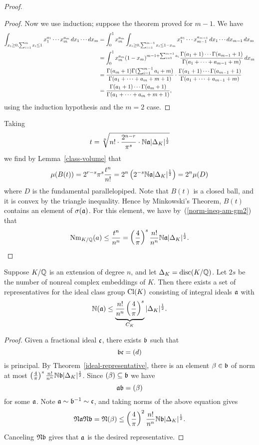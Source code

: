 \begin{proof}
\begin{proof}
Now we use induction; suppose the theorem proved for $m-1$. We have 
\begin{align*}
\int_{x_i\ge 0,\sum_{i=1}^m x_i\le 1} x_1^{a_1}\cdots x_m^{a_m}\,dx_1\cdots dx_m
&=\int_0^1 x_m^{a_m}\int_{x_i\ge 0, \sum_{i=1}^{m-1} x_i\le 1-x_m} x_1^{a_1}\cdots x_{m-1}^{a_{m-1}}\,dx_1\cdots dx_{m-1}\,dx_m\\
&=\int_0^1 x_m^{a_m} (1-x_m)^{m-1+\sum_{i=1}^{m-1} a_i}\frac{\Ga(a_1+1)\cdots \Ga(a_{m-1}+1)}{\Ga(a_1+\cdots +a_{m-1}+m)}\,dx_m\\%
&=%
\frac{\Ga(a_m+1)\Ga(\sum_{i=1}^{m-1}a_i +m)}{\Ga(a_1+\cdots +a_m+m+1)}\cdot \frac{\Ga(a_1+1)\cdots \Ga(a_{m-1}+1)}{\Ga(a_1+\cdots +a_{m-1}+m)}\\%
&=%
\frac{\Ga(a_1+1)\cdots \Ga(a_m+1)}{\Ga(a_1+\cdots +a_m+m+1)},
\end{align*}
using the induction hypothesis and the $m=2$ case.
\end{proof}
Taking
\[
t=\sqrt[n]{n!\cdot \frac{2^{n-r}}{\pi^s} \cdot \mathbb{N}\mathfrak{a} |\Delta_K|^{\frac{1}{2}}}
\]
we find by Lemma~\ref{class-volume} that
\[
\mu(B(t))=2^{r-s}\pi^s\frac{t^n}{n!}=2^n\pa{2^{-s}%
\N\ma%
|\De_K|^{\rc 2}}=2^n \mu(D)
\]
where $D$ is the fundamental parallelopiped. 
Note that $B(t)$ is a closed ball, and it is convex by the triangle inequality. 
Hence by Minkowski's Theorem, $B(t)$ contains an element of $\sigma(\mathfrak{a})$. For this element, we have by~(\ref{norm-ineq-am-gm2}) that
\[
\operatorname{Nm}_{K/\mathbb{Q}}(a)\le \frac{t^n}{n^n}=\left( {\frac{4}{\pi}} \right)^s \frac{n!}{n^n} \mathbb{N}\mathfrak{a} |\Delta_K|^{\frac{1}{2}}.\qedhere
\]
\end{proof}
\begin{thm}
Suppose $K/\mathbb{Q}$ is an extension of degree $n$, and let $\Delta_K=\operatorname{disc}(K/\mathbb{Q})$. Let $2s$ be the number of nonreal complex embeddings of $K$. Then there exists a set of representatives for the ideal class group $\operatorname{Cl}(K)$ consisting of integral ideals $\mathfrak{a}$ with
\[
\mathbb{N}(\mathfrak{a})\le \underbrace{\frac{n!}{n^n}\left( {\frac{4}{\pi}} \right)^s}_{C_K}|\Delta_K|^{\frac{1}{2}}.
\]
\end{thm}
\begin{proof}
Given a fractional ideal $\mathfrak{c}$, there exists $\mathfrak{b}$ such that
\[
\mathfrak{b}\mathfrak{c}=(d)
\]
is principal. 
By Theorem~\ref{ideal-representative}, there is an element $\beta\in \mathfrak{b}$ of norm at most $\left( {\frac{4}{\pi}} \right)^s \frac{n!}{n^n} \mathbb{N}\mathfrak{b} |\Delta_K|^{\frac{1}{2}}$. Since $(\beta)\subseteq \mathfrak{b}$ we have
\[
\mathfrak{a}\mathfrak{b}=(\beta)
\]
for some $\mathfrak{a}$. Note $\mathfrak{a}\sim \mathfrak{b}^{-1}\sim \mathfrak{c}$, and taking norms of the above equation gives
\[
\mathfrak N\mathfrak{a}\mathfrak N\mathfrak{b}=\mathfrak N(\beta)\le \left( {\frac{4}{\pi}} \right)^2 \frac{n!}{n^n} \mathbb{N}\mathfrak{b} |\Delta_K|^{\frac{1}{2}}.
\]
Canceling $\mathfrak N\mathfrak{b}$ gives that $\mathfrak{a}$ is the desired representative.
\end{proof}

